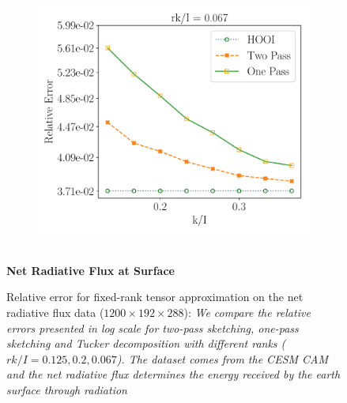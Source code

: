 \begin{figure}[H]
\begin{subfigure}{0.32\textwidth}
    \end{subfigure}
    \begin{subfigure}{0.32\textwidth}
    \includegraphics[scale = 0.3]{figure/SRFRAD_frk15.pdf}
    \end{subfigure}\\ 
    \textbf{Net Radiative Flux at Surface}
    \caption{Relative error for fixed-rank tensor approximation on the net radiative flux data ($1200 \times 192 \times 288$): \textit{We compare the relative errors presented in log scale for two-pass sketching, one-pass sketching and Tucker decomposition with different ranks ($rk/I = 0.125,0.2,0.067$). The dataset comes from the CESM CAM and the net radiative flux determines the energy received by the earth surface through radiation}} \label{fig:srfrad}
\end{figure}

